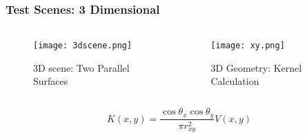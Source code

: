        \begin{frame}\frametitle{Test Scenes: 3 Dimensional}
       \vspace{-0.5 cm}
          \begin{columns}[T]
            \begin{column}{.4\textwidth}
        
                \begin{figure}
                \centering
                \texttt{[image: 3dscene.png]}
                \centering
                \caption{3D scene: Two Parallel Surfaces}
                \label{fig_parallel_3D}
                \end{figure}
                

            \end{column}
          \begin{column}{.5\textwidth}
				\vspace{-8 mm}
                \begin{figure}
                \centering
                \texttt{[image: xy.png]}
                \caption{3D Geometry: Kernel Calculation}
                \label{fig_xy}
                \end{figure}
          \end{column}
        \end{columns}

          \begin{equation} \label{eq:3dkernel}
          K(x,y) =  \frac{\cos \theta_x \cos \theta_y} {\pi r_{xy}^{2}} V(x,y) 
          \end{equation}
          
     
        \end{frame}



